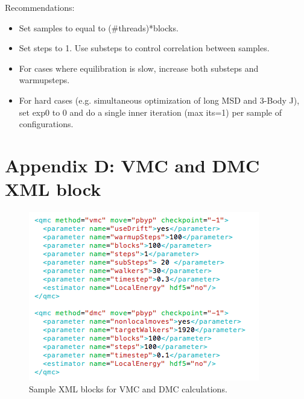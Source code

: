 Recommendations:
\begin{itemize}
  \item{Set samples to equal to (\#threads)*blocks.}
  \item{Set steps to 1. Use substeps to control correlation between samples.}
  \item{For cases where equilibration is slow, increase both substeps and warmupsteps.}
  \item{For hard cases (e.g. simultaneous optimization of long MSD and 3-Body J), set exp0
to 0 and do a single inner iteration (max its=1) per sample of configurations.}
\end{itemize}


\newpage
\section{Appendix D: VMC and DMC XML block}

\begin{figure}[ht!]
\begin{center}
\includegraphics[trim = 0mm 0mm 0mm 0mm, clip,width=0.75\columnwidth]{./figures/lab_advanced_molecules_xml_vmc_dmc}
\end{center}
\caption{Sample XML blocks for VMC and DMC calculations.
\label{fig:lam_xml_vmc_dmc}
}
\end{figure}


